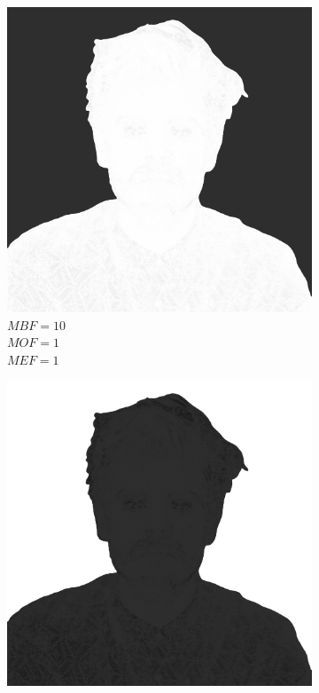 \documentclass[a4paper, 12pt, polish, twoside]{extreport}
\begin{document}
\begin{figure}[H]
\begin{subfigure}{0.32\textwidth}
        \includegraphics[width = \textwidth]{img/4-mine/taco-mask/taco_mask_c20_inv0_bg10_obj1_ed1.png}
        \caption{\(MBF = 10\) \\ \(MOF = 1\) \\ \(MEF = 1\)}
        \label{mine-param-taco-d}
    \end{subfigure}
    \begin{subfigure}{0.32\textwidth}
        \centering
        \includegraphics[width = \textwidth]{img/4-mine/taco-mask/taco_mask_c20_inv0_bg1_obj10_ed1.png}

\end{subfigure}
\end{figure}
\end{document}
